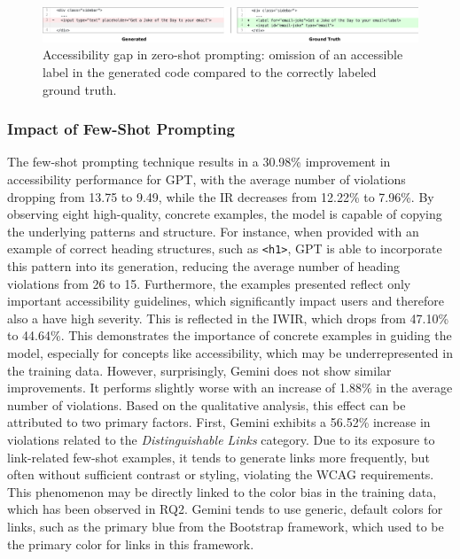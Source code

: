 \begin{figure}
  \centering
  \includegraphics[width=1\linewidth]{figures/zeroshot-example.png}
  \caption{Accessibility gap in zero-shot prompting: omission of an accessible label in the generated code compared to the correctly labeled ground truth.}
  \label{fig:zero-shot-example} 
\end{figure}

\subsubsection{Impact of Few-Shot Prompting}
The few-shot prompting technique results in a 30.98\% improvement
in accessibility performance for GPT, with the average number 
of violations dropping from 13.75 to 9.49, while the IR 
decreases from 12.22\% to 7.96\%. By observing eight 
high-quality, concrete examples, the model is capable of 
copying the underlying patterns and structure. For instance,
when provided with an example of correct heading structures, such 
as \texttt{<h1>}, GPT is able to incorporate this pattern into its
generation, reducing the average number of heading violations 
from 26 to 15. Furthermore, the examples presented 
reflect only important accessibility guidelines, which 
significantly impact users and therefore also a have high 
severity. This is reflected in the IWIR, which drops from 
47.10\% to 44.64\%.
This demonstrates the importance of concrete 
examples in guiding the model, especially for concepts like
accessibility, which may be underrepresented in the training data.\newline
However, surprisingly, Gemini does not show similar improvements.
It performs slightly worse with an increase of 1.88\% in the average
number of violations. Based on the qualitative analysis, this
effect can be attributed to two primary factors. First, Gemini
exhibits a 56.52\% increase in violations related to the
\emph{Distinguishable Links} category. Due to its exposure
to link-related few-shot examples, it tends to generate links more 
frequently, but often without sufficient contrast or 
styling, violating the WCAG requirements. This phenomenon 
may be directly linked to the color bias in the training data,
which has been observed in RQ2. Gemini tends to use generic, default 
colors for links, such as the primary blue from the Bootstrap framework,
which used to be the primary color for links in this framework. 
